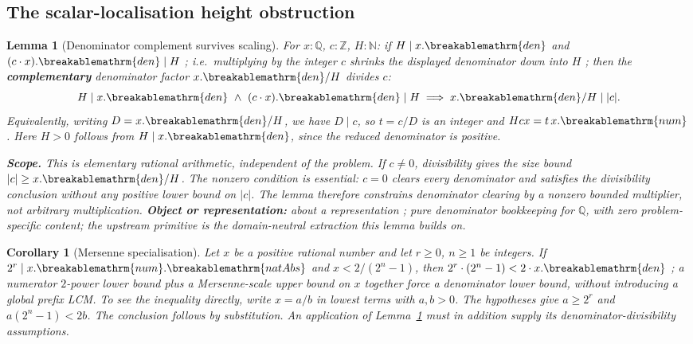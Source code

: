 \documentclass[11pt]{article}
\theoremstyle{plain}
\newtheorem{lem}[thm]{Lemma}
\newtheorem{cor}[thm]{Corollary}
\theoremstyle{definition}
\theoremstyle{remark}
\renewcommand{\mathrm}[1]{\ifmmode\breakablemathrm{#1}\else\textrm{#1}\fi}%
\begin{document}
\subsection{The scalar-localisation height obstruction}

\begin{lem}[Denominator complement survives scaling]
\label{lem:scalar-localization}
For $x:\mathbb Q$, $c:\mathbb Z$, $H:\mathbb N$: if $H\mid x.\mathrm{den}$ and
$(c\cdot x).\mathrm{den}\mid H$ ;  i.e.\ multiplying by the integer $c$ shrinks the displayed
denominator down \emph{into} $H$ ;  then the \textbf{complementary} denominator factor
$x.\mathrm{den}/H$ divides $c$:
\[
  H\mid x.\mathrm{den} \ \land\ (c\cdot x).\mathrm{den}\mid H \implies x.\mathrm{den}/H \mid |c|.
\]
Equivalently, writing $D=x.\mathrm{den}/H$, we have $D\mid c$,
so $t=c/D$ is an integer and $Hcx=t\,x.\mathrm{num}$.
Here $H>0$ follows from $H\mid x.\mathrm{den}$, since the
reduced denominator is positive.

\textbf{Scope.} This is elementary rational arithmetic, independent
of the problem.  If $c\ne0$, divisibility gives the size bound
$|c|\ge x.\mathrm{den}/H$.  The nonzero condition is essential:
$c=0$ clears every denominator and satisfies the divisibility
conclusion without any positive lower bound on $|c|$.  The lemma
therefore constrains denominator clearing by a nonzero bounded
multiplier, not arbitrary multiplication.
\textbf{Object or representation:} about a
\emph{representation} ;  pure denominator bookkeeping for $\mathbb Q$, with zero problem-specific
content; the upstream primitive
is the domain-neutral extraction this lemma builds on.
\end{lem}

\begin{cor}[Mersenne specialisation]
\label{cor:mersenne-height}
Let $x$ be a positive rational number and let $r\ge0$, $n\ge1$
be integers.  If $2^r\mid x.\mathrm{num}.\mathrm{natAbs}$ and
$x<2/(2^n-1)$, then
$2^r\cdot(2^n-1) < 2\cdot x.\mathrm{den}$ ;  a numerator $2$-power lower bound plus a Mersenne-scale
upper bound on $x$ together force a denominator lower bound, \emph{without} introducing a global
prefix LCM.
To see the inequality directly, write $x=a/b$ in lowest terms
with $a,b>0$.  The hypotheses give $a\ge2^r$ and
$a(2^n-1)<2b$.  The conclusion follows by substitution.
An application of Lemma~\ref{lem:scalar-localization} must in
addition supply its denominator-divisibility assumptions.
\end{cor}
\end{document}
